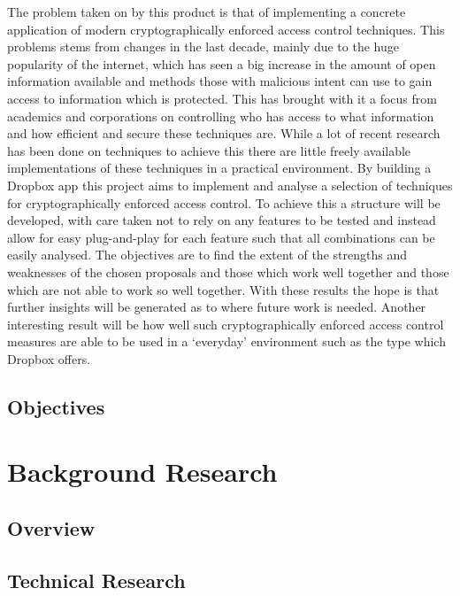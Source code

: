 \documentclass[12pt, titlepage]{article}
\begin{document}
The problem taken on by this product is that of implementing a concrete application of modern cryptographically enforced access control techniques. This problems stems from changes in the last decade, mainly due to the huge popularity of the internet, which has seen a big increase in the amount of open information available and methods those with malicious intent can use to gain access to information which is protected. This has brought with it a focus from academics and corporations on controlling who has access to what information and how efficient and secure these techniques are. While a lot of recent research has been done on techniques to achieve this there are little freely available implementations of these techniques in a practical environment.
\newline \indent By building a Dropbox app this project aims to implement and analyse a selection of techniques for cryptographically enforced access control. To achieve this a structure will be developed, with care taken not to rely on any features to be tested and instead allow for easy plug-and-play for each feature such that all combinations can be easily analysed. The objectives are to find the extent of the strengths and weaknesses of the chosen proposals and those which work well together and those which are not able to work so well together. With these results the hope is that further insights will be generated as to where future work is needed. Another interesting result will be how well such cryptographically enforced access control measures are able to be used in a `everyday' environment such as the type which Dropbox offers.

\subsection{Objectives}

\section{Background Research}
\subsection{Overview}

\subsection{Technical Research}
\end{document}
